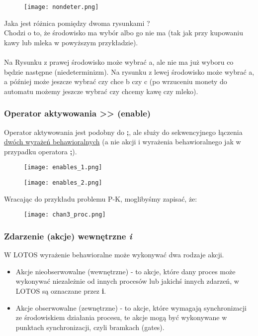 \documentclass[a4paper,15pt]{article}
\begin{document}
\begin{figure}[H]
\centerline{\texttt{[image: nondeter.png]}}
\label{fig:auto_proc}
\end{figure}

Jaka jest różnica pomiędzy dwoma rysunkami ? \\ Chodzi o to, że środowisko ma wybór albo go nie ma (tak jak przy kupowaniu kawy lub mleka w powyższym przykładzie). \\ \\ Na Rysunku z prawej środowisko może wybrać a, ale nie ma już wyboru co będzie następne (niedeterminizm). Na rysunku z lewej środowisko może wybrać a, a później może jeszcze wybrać czy chce b czy c (po wrzuceniu monety do automatu możemy jeszcze wybrać czy chcemy kawę czy mleko).



\newpage
\subsubsection{Operator aktywowania >> (enable) }
Operator aktywowania jest podobny do \textbf{;}, ale służy do sekwencyjnego łączenia \underline{dwóch wyrażeń behawioralnych} (a nie akcji i wyrażenia behawioralnego jak w przypadku operatora \textbf{;}).
\begin{figure}[H]
\centerline{\texttt{[image: enables\_1.png]}}
\label{fig:enables_1}
\end{figure}

\begin{figure}[H]
\centerline{\texttt{[image: enables\_2.png]}}
\label{fig:enables_2}
\end{figure}

\newpage
Wracając do przykładu problemu P-K, moglibyśmy zapisać, że:
\begin{figure}[H]
\centerline{\texttt{[image: chan3\_proc.png]}}
\label{fig:chan3_proc}
\end{figure}





\newpage
\subsubsection{Zdarzenie (akcje) wewnętrzne \textit{i}}


W LOTOS wyrażenie behawioralne może wykonywać dwa rodzaje akcji.
\begin{itemize}
\item Akcje nieobserwowalne (wewnętrzne) - to akcje, które dany proces może wykonywać niezależnie od innych procesów lub jakichś innych zdarzeń, w LOTOS są oznaczane przez \textbf{i}.
\item Akcje obserwowalne (zewnętrzne) - to akcje, które wymagają synchronizacji ze środowiskiem działania procesu, te akcje mogą być wykonywane w punktach synchronizacji, czyli bramkach (gates). 

\end{itemize}
\end{document}

